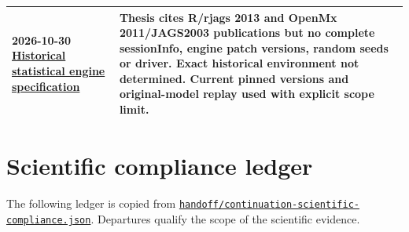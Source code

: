 \documentclass[11pt]{article}
\begin{document}
\begin{longtable}{p{75pt}p{370pt}}
2026-10-30 \href{https://github.com/ingaschwabe/Nature-Nurture-and-Item-Response-Theory}{Historical statistical engine specification} & Thesis cites R/rjags 2013 and OpenMx 2011/JAGS2003 publications but no complete sessionInfo, engine patch versions, random seeds or driver. Exact historical environment not determined. Current pinned versions and original-model replay used with explicit scope limit.\\
\bottomrule\end{longtable}\section{Scientific compliance ledger}
The following ledger is copied from \href{https://github.com/alectionary/vibe-math/blob/master/formalization/schwabe-psychometric-genetics/handoff/continuation-scientific-compliance.json}{\nolinkurl{handoff/continuation-scientific-compliance.json}}. Departures qualify the scope of the scientific evidence.
\end{document}
